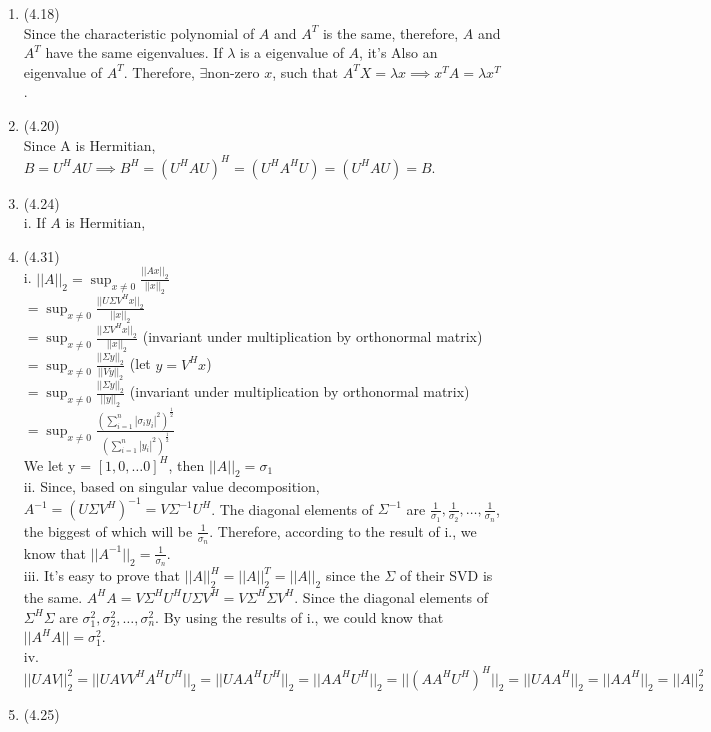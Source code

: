 \documentclass[letterpaper,12pt]{article}
\theoremstyle{definition}
\begin{document}
\begin{enumerate}
	\item(4.18)\\
	Since the characteristic polynomial of $A$ and $A^{T}$ is the same, therefore, $A$ and $A^{T}$ have the same eigenvalues. If $\lambda$ is a eigenvalue of $A$, it's Also an eigenvalue of $A^{T}$. Therefore, $\exists $non-zero $x$, such that $A^{T}X = \lambda x \implies x^{T}A =\lambda x^{T}$.\\

	\item(4.20)\\
	Since A is Hermitian, $B = U^{H}AU \implies B^{H} = ( U^{H}AU)^{H} = (U^{H}A^{H}U) = (U^{H}AU) = B$.\\
	
	\item(4.24)\\
	i. If $A$ is Hermitian, \\

	\item(4.31)\\
	i. $||A||_{2} = \sup_{x \neq 0} \frac{||Ax||_{2}}{||x||_{2}}$\\
	   $=  \sup_{x \neq 0} \frac{||U\Sigma V^{H}x||_{2}}{||x||_{2}}$\\
	   $= \sup_{x \neq 0} \frac{||\Sigma V^{H}x||_{2}}{||x||_{2}}$ (invariant under multiplication by orthonormal matrix)\\
	   $= \sup_{x \neq 0} \frac{||\Sigma y||_{2}}{||Vy||_{2}}$ (let $y  = V^{H}x$)\\
	   $= \sup_{x \neq 0} \frac{||\Sigma y||_{2}}{||y||_{2}}$  (invariant under multiplication by orthonormal matrix)\\
	   $= \sup_{x \neq 0} \frac{(\sum_{i = 1}^{n} |\sigma_{i}y_{i}|^{2})^{\frac{1}{2}}}{(\sum_{i = 1}^{n} |y_{i}|^{2})^{\frac{1}{2}}}$\\
	   We let y =  $[1, 0, \hdots 0]^{H}$, then $||A||_{2} = \sigma_{1}$\\
	ii. Since, based on singular value decomposition, $A^{-1} = (U\Sigma V^{H})^{-1} = V \Sigma^{-1} U^{H}$. The diagonal elements of $\Sigma^{-1}$ are $\frac{1}{\sigma_{1}}, \frac{1}{\sigma_{2}}, \hdots, \frac{1}{\sigma_{n}}$, the biggest of which will be $\frac{1}{\sigma_{n}}$. Therefore, according to the result of i., we know that $||A^{-1}||_{2} = \frac{1}{\sigma_{n}}$.\\
	iii. It's easy to prove that $||A||_{2}^{H} = ||A||_{2}^{T} = ||A||_{2}$ since the $\Sigma$ of their SVD is the same. $A^{H}A = V\Sigma^{H}U^{H}U\Sigma V^{H} = V \Sigma^{H}\Sigma V^{H}$. Since the diagonal elements of $ \Sigma^{H}\Sigma$ are $\sigma_{1}^{2}, \sigma_{2}^{2}, \hdots, \sigma_{n}^{2}$. By using the results of i., we could know that $||A^{H}A|| = \sigma_{1}^{2}$.\\
	iv. $||UAV||_{2}^{2} = ||UAVV^{H}A^{H}U^{H}||_{2} = ||UAA^{H}U^{H}||_{2} = ||AA^{H}U^{H}||_{2} = ||(AA^{H}U^{H})^{H}||_{2} = ||UAA^{H}||_{2} = ||AA^{H}||_{2} = ||A||_{2}^{2}$\\

	\item(4.25)\\
	
	


\end{enumerate}

\vspace{25mm}
\end{document}
